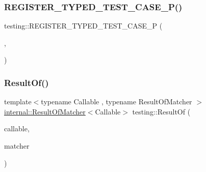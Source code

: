 \mbox{\label{namespacetesting_a9fc96ebb1c0e7db169c4a5697c903f56}} 
\subsubsection{\texorpdfstring{R\+E\+G\+I\+S\+T\+E\+R\+\_\+\+T\+Y\+P\+E\+D\+\_\+\+T\+E\+S\+T\+\_\+\+C\+A\+S\+E\+\_\+\+P()}{REGISTER\_TYPED\_TEST\_CASE\_P()}}
{\footnotesize\ttfamily testing\+::\+R\+E\+G\+I\+S\+T\+E\+R\+\_\+\+T\+Y\+P\+E\+D\+\_\+\+T\+E\+S\+T\+\_\+\+C\+A\+S\+E\+\_\+P (\begin{DoxyParamCaption}\item[{\hyperlink{classtesting_1_1_code_location_for_t_y_p_e_d_t_e_s_t_p}{Code\+Location\+For\+T\+Y\+P\+E\+D\+T\+E\+S\+TP}}]{,  }\item[{Verify}]{ }\end{DoxyParamCaption})}

\mbox{\label{namespacetesting_aaadb51dd383baa95f123ab891d4f8a5f}} 
\subsubsection{\texorpdfstring{Result\+Of()}{ResultOf()}}
{\footnotesize\ttfamily template$<$typename Callable , typename Result\+Of\+Matcher $>$ \\
\hyperlink{classtesting_1_1internal_1_1_result_of_matcher}{internal\+::\+Result\+Of\+Matcher}$<$Callable$>$ testing\+::\+Result\+Of (\begin{DoxyParamCaption}\item[{Callable}]{callable,  }\item[{const Result\+Of\+Matcher \&}]{matcher }\end{DoxyParamCaption})}

\mbox{\label{namespacetesting_af6d1c13e9376c77671e37545cd84359c}} 
